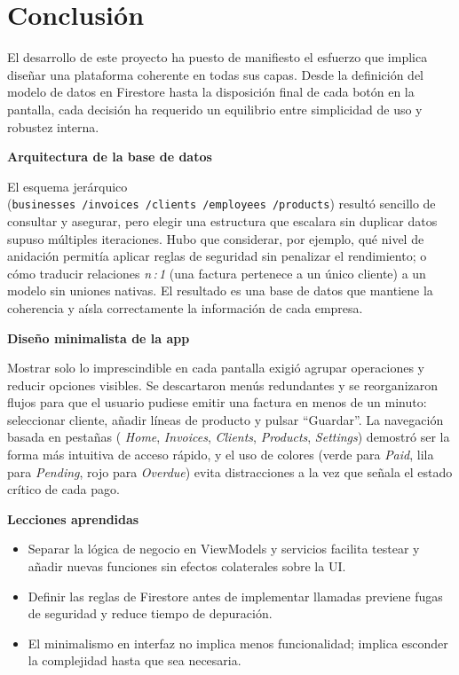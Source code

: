 \section{Conclusión}

\begin{large}

El desarrollo de este proyecto ha puesto de manifiesto el esfuerzo que implica diseñar una plataforma coherente en todas sus capas. Desde la definición del modelo de datos en Firestore hasta la disposición final de cada botón en la pantalla, cada decisión ha requerido un equilibrio entre simplicidad de uso y robustez interna.

\textbf{Arquitectura de la base de datos}

El esquema jerárquico (\texttt{businesses\,/invoices\,/clients\,/employees\,/products}) resultó sencillo de consultar y asegurar, pero elegir una estructura que escalara sin duplicar datos supuso múltiples iteraciones. Hubo que considerar, por ejemplo, qué nivel de anidación permitía aplicar reglas de seguridad sin penalizar el rendimiento; o cómo traducir relaciones \emph{n\,:\,1} (una factura pertenece a un único cliente) a un modelo sin uniones nativas. El resultado es una base de datos que mantiene la coherencia y aísla correctamente la información de cada empresa.

\textbf{Diseño minimalista de la app}

Mostrar solo lo imprescindible en cada pantalla exigió agrupar operaciones y reducir opciones visibles. Se descartaron menús redundantes y se reorganizaron flujos para que el usuario pudiese emitir una factura en menos de un minuto: seleccionar cliente, añadir líneas de producto y pulsar “Guardar”. La navegación basada en pestañas (
\textit{Home}, \textit{Invoices}, \textit{Clients}, \textit{Products}, \textit{Settings}) demostró ser la forma más intuitiva de acceso rápido, y el uso de colores (verde para \textit{Paid}, lila para \textit{Pending}, rojo para \textit{Overdue}) evita distracciones a la vez que señala el estado crítico de cada pago.

\textbf{Lecciones aprendidas}

\begin{itemize}
  \item Separar la lógica de negocio en ViewModels y servicios facilita testear y añadir nuevas funciones sin efectos colaterales sobre la UI.
  \item Definir las reglas de Firestore antes de implementar llamadas previene fugas de seguridad y reduce tiempo de depuración.
  \item El minimalismo en interfaz no implica menos funcionalidad; implica esconder la complejidad hasta que sea necesaria.
\end{itemize}


\end{large}
